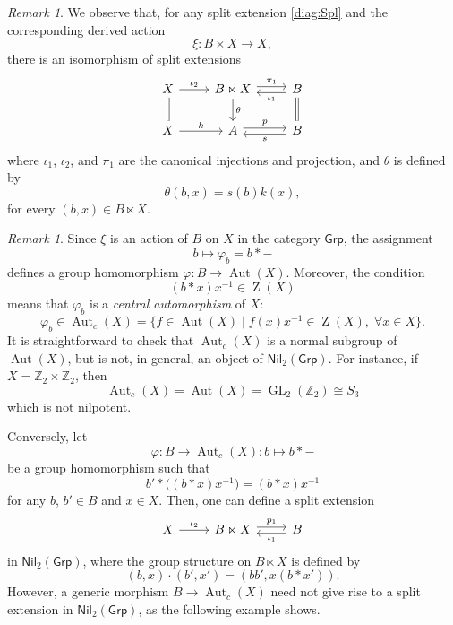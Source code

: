 \documentclass[reqno,hidelinks,a4paper]{amsart}
\theoremstyle{plain}
\theoremstyle{definition}
\theoremstyle{remark}
\newtheorem{remark}[subsection]{Remark}
\numberwithin{equation}{section}
\newcommand{\Z}{\mathbb{Z}}
\DeclareMathOperator{\bZ}{Z}
\DeclareMathOperator{\Aut}{Aut}
\newcommand{\Grp}{\ensuremath{\mathsf{Grp}}}
\newcommand{\Nil}{\ensuremath{\mathsf{Nil}}}
\begin{document}
\begin{remark}
    We observe that, for any split extension \eqref{diag:Spl} and the corresponding derived action
    \[
        \xi \colon B \times X \to X,
    \]
    there is an isomorphism of split extensions
    \begin{equation*}
        \begin{tikzcd}
            X \arrow[r, "\iota_2"] \arrow[d, equal]
            & B \ltimes X \arrow[r, shift left, "\pi_1"] \arrow[d, "\theta"]
            & B \arrow[l, shift left, "\iota_1"] \arrow[d, equal] \\
            X \arrow[r, "k"]
            & A \arrow[r, shift left, "p"]
            & B \arrow[l, shift left, "s"]
        \end{tikzcd}
    \end{equation*}
    where \(\iota_1\), \(\iota_2\), and \(\pi_1\) are the canonical injections and projection, and \(\theta\) is defined by
    \[
        \theta(b,x)=s(b)k(x),
    \]
    for every \((b,x)\in B\ltimes X\).
\end{remark}

\begin{remark}\label{rmk}
    Since \(\xi\) is an action of \(B\) on \(X\) in the category \(\Grp\), the assignment
    \[
        b \mapsto \varphi_b = b \ast -
    \]
    defines a group homomorphism \(\varphi \colon B \to \Aut(X)\). Moreover, the condition
    \[
        (b \ast x)x^{-1} \in \bZ(X)
    \]
    means that \(\varphi_b\) is a \emph{central automorphism} of \(X\):
    \[
        \varphi_b \in \Aut_c(X)=\{ f \in \Aut(X) \mid f(x)x^{-1} \in \bZ(X), \; \forall x \in X \}.
    \]
    It is straightforward to check that \(\Aut_c(X)\) is a normal subgroup of \(\Aut(X)\), but is not, in general, an object of \(\Nil_2(\Grp)\). For instance, if \(X=\Z_2\times \Z_2\), then
    \[
        \Aut_c(X)=\Aut(X)=\operatorname{GL}_2(\Z_2) \cong S_3
    \]
    which is not nilpotent.

    Conversely, let
    \[
        \varphi \colon B \to \Aut_c(X) \colon b \mapsto b \ast -
    \]
    be a group homomorphism such that
    \[
        b' \ast \bigl((b \ast x)x^{-1}\bigr)=(b \ast x)x^{-1}
    \]
    for any \(b\), \(b' \in B\) and \(x \in X\). Then, one can define a split extension
    \begin{equation*}
        \begin{tikzcd}
            X \arrow[r, "\iota_2"]
            & B \ltimes X \arrow[r, shift left, "p_1"]
            & B \arrow[l, shift left, "\iota_1"]
        \end{tikzcd}
    \end{equation*}
    in \(\Nil_2(\Grp)\), where the group structure on \(B \ltimes X\) is defined by
    \[
        (b,x)\cdot (b',x')=(bb',x(b\ast x')).
    \]
    However, a generic morphism \(B \to \Aut_c(X)\) need not give rise to a split extension in \(\Nil_2(\Grp)\), as the following example shows.
\end{remark}
\end{document}
